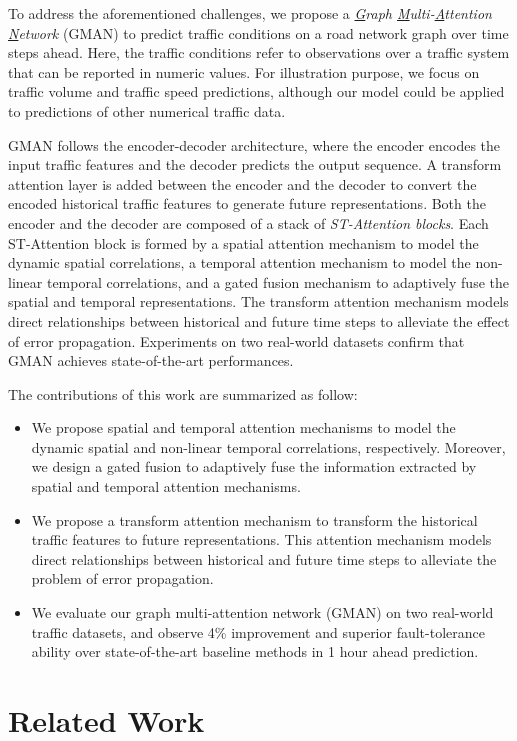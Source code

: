 \documentclass[letterpaper]{article} \usepackage{aaai20}  \usepackage{times}  \usepackage{helvet} \usepackage{courier}  \usepackage[hyphens]{url}  \usepackage{graphicx} \usepackage{amsmath}
\begin{document}
To address the aforementioned challenges, we propose a \textit{\underline{G}raph \underline{M}ulti-\underline{A}ttention \underline{N}etwork} (GMAN) to predict traffic conditions on a road network graph over time steps ahead. Here, the traffic conditions refer to observations over a traffic system that can be reported in numeric values. For illustration purpose, we focus on traffic volume and traffic speed predictions, although our model could be applied to predictions of other numerical traffic data.

GMAN follows the encoder-decoder architecture, where the encoder encodes the input traffic features and the decoder predicts the output sequence. A transform attention layer is added between the encoder and the decoder to convert the encoded historical traffic features to generate future representations. Both the encoder and the decoder are composed of a stack of \textit{ST-Attention blocks}. Each ST-Attention block is formed by a spatial attention mechanism to model the dynamic spatial correlations, a temporal attention mechanism to model the non-linear temporal correlations, and a gated fusion mechanism to adaptively fuse the spatial and temporal representations. The transform attention mechanism models direct relationships between historical and future time steps to alleviate the effect of error propagation. Experiments on two real-world datasets confirm that GMAN achieves state-of-the-art performances. 

The contributions of this work are summarized as follow:
\begin{itemize}
	\item We propose spatial and temporal attention mechanisms to model the dynamic spatial and non-linear temporal correlations, respectively. Moreover, we design a gated fusion to adaptively fuse the information extracted by spatial and temporal attention mechanisms.
	\item We propose a transform attention mechanism to transform the historical traffic features to future representations. This attention mechanism models direct relationships between historical and future time steps to alleviate the problem of error propagation.
	\item We evaluate our graph multi-attention network (GMAN) on two real-world traffic datasets, and observe 4\% improvement and superior fault-tolerance ability over state-of-the-art baseline methods in 1 hour ahead prediction.
\end{itemize}

\section{Related Work}
\end{document}
